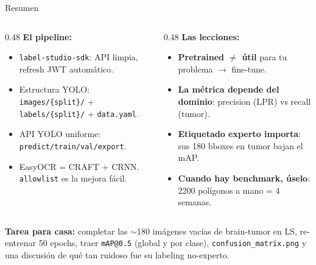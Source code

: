 \documentclass[aspectratio=169, 11pt]{beamer}
\begin{document}
\begin{frame}[shrink]{Resumen}
  \vspace{6pt}
  \begin{columns}[T]
    \begin{column}{0.48\textwidth}
      {\footnotesize\bfseries\color{arcaDark} El pipeline:}
      \vspace{4pt}

      {\scriptsize
      \begin{itemize}\setlength{\itemsep}{4pt}
        \item \texttt{label-studio-sdk}: API limpia, refresh JWT autom\'atico.
        \item Estructura YOLO: \texttt{images/\{split\}/} + \texttt{labels/\{split\}/} + \texttt{data.yaml}.
        \item API YOLO uniforme: \texttt{predict/train/val/export}.
        \item EasyOCR = CRAFT + CRNN. \texttt{allowlist} es la mejora f\'acil.
      \end{itemize}
      }
    \end{column}
    \begin{column}{0.48\textwidth}
      {\footnotesize\bfseries\color{arcaDark} Las lecciones:}
      \vspace{4pt}

      {\scriptsize
      \begin{itemize}\setlength{\itemsep}{4pt}
        \item \textbf{Pretrained $\neq$ \'util} para tu problema $\to$ fine-tune.
        \item \textbf{La m\'etrica depende del dominio}: precision (LPR) vs recall (tumor).
        \item \textbf{Etiquetado experto importa}: sus 180 bboxes en tumor bajan el mAP.
        \item \textbf{Cuando hay benchmark, \'uselo}: 2200 pol\'igonos a mano = 4 semanas.
      \end{itemize}
      }
    \end{column}
  \end{columns}

  \vspace{12pt}
  \begin{tcolorbox}[colback=codeGreen!8, colframe=codeGreen, boxrule=0.5pt,
    arc=2pt, left=6pt, right=6pt, top=4pt, bottom=4pt]
    {\scriptsize\color{arcaDark}
    \faKey\hspace{4pt}\textbf{Tarea para casa:} completar las $\sim$180
    im\'agenes vac\'ias de brain-tumor en LS, re-entrenar 50 epochs,
    traer \texttt{mAP@0.5} (global y por clase), \texttt{confusion\_matrix.png}
    y una discusi\'on de qu\'e tan ruidoso fue su labeling no-experto.}
  \end{tcolorbox}
\end{frame}
\end{document}
